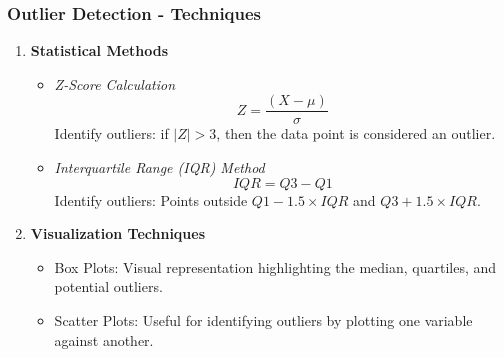 \documentclass[aspectratio=169]{beamer}
\begin{document}
\begin{frame}[fragile]
    \frametitle{Outlier Detection - Techniques}
    \begin{enumerate}
        \item \textbf{Statistical Methods}
        \begin{itemize}
            \item \textit{Z-Score Calculation}
            \begin{equation}
                Z = \frac{(X - \mu)}{\sigma}
            \end{equation}
            Identify outliers: if \( |Z| > 3 \), then the data point is considered an outlier.
            \item \textit{Interquartile Range (IQR) Method}
            \begin{equation}
                IQR = Q3 - Q1
            \end{equation}
            Identify outliers: Points outside \( Q1 - 1.5 \times IQR \) and \( Q3 + 1.5 \times IQR \).
        \end{itemize}
        \item \textbf{Visualization Techniques}
        \begin{itemize}
            \item Box Plots: Visual representation highlighting the median, quartiles, and potential outliers.
            \item Scatter Plots: Useful for identifying outliers by plotting one variable against another.
        \end{itemize}
    \end{enumerate}
\end{frame}
\end{document}
